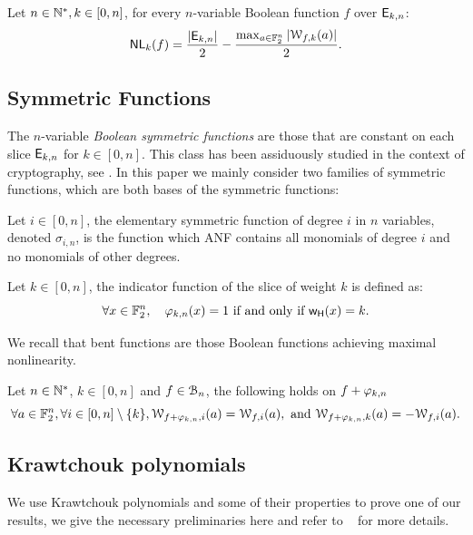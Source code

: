 \documentclass[11pt]{llncs}
\begin{document}
\begin{Prop}\label{prop:nlk}
	Let $n\in \mathbb{N}^*, k\in [0,n]$, for every $n$-variable Boolean function $f$ over $\mathsf{E}_{k,n}$:
	\[ \mathsf{NL}_{k}(f)=\frac{|\mathsf{E}_{k,n}|}{2} -\frac{\max_{a\in \mathbb{F}_2^n} |\mathcal{W}_{f,k}(a)|}{2}  .\]
\end{Prop}


\subsection{Symmetric Functions}


The $n$-variable \emph{Boolean symmetric functions} are those that are constant on each slice $\mathsf{E}_{k,n}$ for $k\in [0,n]$. 
This class has been assiduously studied in the context of cryptography, see \eg \cite{IEEE:Carlet04,IEEE:CanVid05,INDO:BraPre05,DM:SarMai07,IEEE:QFLW09,CCDS:Meaux21,IEEE:CarMea21}.
In this paper we mainly consider two families of symmetric functions, which are both bases of the symmetric functions:

\begin{definition}
Let $i\in [0,n]$, the elementary symmetric function of degree $i$ in $n$ variables, denoted $\sigma_{i,n}$, is the function which ANF contains all monomials of degree $i$ and no monomials of other degrees. 
\end{definition}
\begin{definition}
 Let $k\in [0,n]$, the indicator function of the slice of weight $k$ is defined as:
 \[\forall  x\in \mathbb{F}_2^{n}, \quad \varphi_{k,n}(x) = 1 \text{ if and only if } \mathsf{w_H}(x) = k.\]
\end{definition}
We recall that bent functions are those Boolean functions achieving maximal nonlinearity.



\begin{Prop}\label{prop:AddSym}
	Let $n\in \mathbb{N}^*$, $k\in [0,n]$ and $f \in \mathcal{B}_{n}$, the following holds on $f+\varphi_{k,n}$
	\[\forall a\in \mathbb{F}_2^n, \forall i\in [0,n]\setminus \{k\}, \mathcal{W}_{f+\varphi_{k,n},i}(a)=\mathcal{W}_{f,i}(a),\text{ and } \mathcal{W}_{f+\varphi_{k,n},k}(a)=-\mathcal{W}_{f,i}(a).\]	
\end{Prop}


\subsection{Krawtchouk polynomials}
We use Krawtchouk polynomials and some of their properties to prove one of our results, we give the necessary preliminaries here and refer to \eg ~\cite{book:MacSlo78} for more details.
\end{document}
